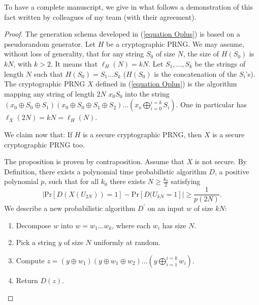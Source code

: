 To have a complete manuscript, we give in what follows a demonstration of this 
fact written by colleagues of
my team (with their agreement). 

\begin{proof}
The generation schema developed in (\ref{equation Oplus}) is based on a
pseudorandom generator. Let $H$ be a cryptographic PRNG. We may assume,
without loss of generality, that for any string $S_0$ of size $N$, the size
of $H(S_0)$ is $kN$, with $k>2$. It means that $\ell_H(N)=kN$. 
Let $S_1,\ldots,S_k$ be the 
strings of length $N$ such that $H(S_0)=S_1 \ldots S_k$ ($H(S_0)$ is the concatenation of
the $S_i$'s). The cryptographic PRNG $X$ defined in (\ref{equation Oplus})
is the algorithm mapping any string of length $2N$ $x_0S_0$ into the string
$(x_0\oplus S_0 \oplus S_1)(x_0\oplus S_0 \oplus S_1\oplus S_2)\ldots
(x_o\bigoplus_{i=0}^{i=k}S_i)$. One in particular has $\ell_{X}(2N)=kN=\ell_H(N)$. 

We claim now that:
If $H$ is a secure cryptographic PRNG, then $X$ is a secure cryptographic
PRNG too.


The proposition is proven by contraposition. Assume that $X$ is not
secure. By Definition, there exists a polynomial time probabilistic
algorithm $D$, a positive polynomial $p$, such that for all $k_0$ there exists
$N\geq \frac{k_0}{2}$ satisfying 
$$| \mathrm{Pr}[D(X(U_{2N}))=1]-\mathrm{Pr}[D(U_{kN}=1]|\geq \frac{1}{p(2N)}.$$
We describe a new probabilistic algorithm $D^\prime$ on an input $w$ of size
$kN$:
\begin{enumerate}
\item Decompose $w$ into $w=w_1\ldots w_{k}$, where each $w_i$ has size $N$.
\item Pick a string $y$ of size $N$ uniformly at random.
\item Compute $z=(y\oplus w_1)(y\oplus w_1\oplus w_2)\ldots (y
  \bigoplus_{i=1}^{i=k} w_i).$
\item Return $D(z)$.
\end{enumerate}



\end{proof}
